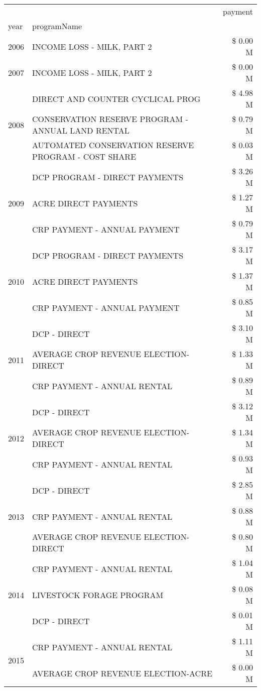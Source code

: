 \begin{tabular}{llr}
\toprule
 &  & payment \\
year & programName &  \\
\midrule
2006 & INCOME LOSS - MILK, PART 2 & \$ 0.00 M \\
\cline{1-3}
2007 & INCOME LOSS - MILK, PART 2 & \$ 0.00 M \\
\cline{1-3}
\multirow[t]{3}{*}{2008} & DIRECT AND COUNTER CYCLICAL PROG & \$ 4.98 M \\
 & CONSERVATION RESERVE PROGRAM - ANNUAL LAND RENTAL & \$ 0.79 M \\
 & AUTOMATED CONSERVATION RESERVE PROGRAM - COST SHARE & \$ 0.03 M \\
\cline{1-3}
\multirow[t]{3}{*}{2009} & DCP PROGRAM - DIRECT PAYMENTS & \$ 3.26 M \\
 & ACRE DIRECT PAYMENTS & \$ 1.27 M \\
 & CRP PAYMENT - ANNUAL PAYMENT & \$ 0.79 M \\
\cline{1-3}
\multirow[t]{3}{*}{2010} & DCP PROGRAM - DIRECT PAYMENTS & \$ 3.17 M \\
 & ACRE DIRECT PAYMENTS & \$ 1.37 M \\
 & CRP PAYMENT - ANNUAL PAYMENT & \$ 0.85 M \\
\cline{1-3}
\multirow[t]{3}{*}{2011} & DCP - DIRECT & \$ 3.10 M \\
 & AVERAGE CROP REVENUE ELECTION-DIRECT & \$ 1.33 M \\
 & CRP PAYMENT - ANNUAL RENTAL & \$ 0.89 M \\
\cline{1-3}
\multirow[t]{3}{*}{2012} & DCP - DIRECT & \$ 3.12 M \\
 & AVERAGE CROP REVENUE ELECTION-DIRECT & \$ 1.34 M \\
 & CRP PAYMENT - ANNUAL RENTAL & \$ 0.93 M \\
\cline{1-3}
\multirow[t]{3}{*}{2013} & DCP - DIRECT & \$ 2.85 M \\
 & CRP PAYMENT - ANNUAL RENTAL & \$ 0.88 M \\
 & AVERAGE CROP REVENUE ELECTION-DIRECT & \$ 0.80 M \\
\cline{1-3}
\multirow[t]{3}{*}{2014} & CRP PAYMENT - ANNUAL RENTAL & \$ 1.04 M \\
 & LIVESTOCK FORAGE PROGRAM & \$ 0.08 M \\
 & DCP - DIRECT & \$ 0.01 M \\
\cline{1-3}
\multirow[t]{3}{*}{2015} & CRP PAYMENT - ANNUAL RENTAL & \$ 1.11 M \\
 & AVERAGE CROP REVENUE ELECTION-ACRE & \$ 0.00 M \\

\end{tabular}
